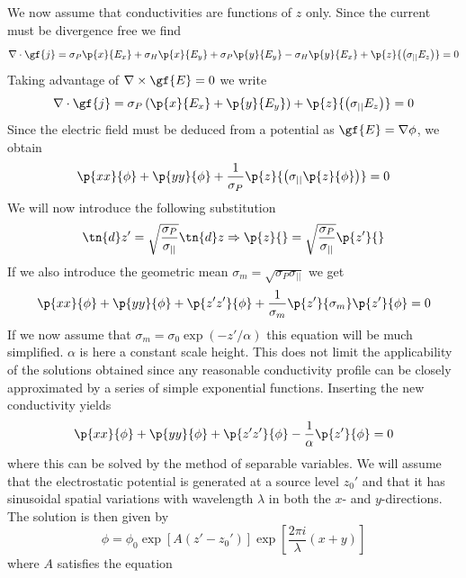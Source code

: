 We now assume that conductivities are functions of \(z\) only. Since the current must be divergence free we find
\begin{equation*}
    \nabla\cdot\gf{j}=\sigma_P\p{x}{E_x}+\sigma_H\p{x}{E_y}+\sigma_P\p{y}{E_y}-\sigma_H\p{y}{E_x}+\p{z}{\left(\sigma_{||}E_z\right)}=0
\end{equation*}
Taking advantage of \(\nabla\times\gf{E}=0\) we write
\begin{equation*}
    \nabla\cdot\gf{j}=\sigma_P\left(\p{x}{E_x}+\p{y}{E_y}\right)+\p{z}{\left(\sigma_{||}E_z\right)}=0
\end{equation*}
Since the electric field must be deduced from a potential as \(\gf{E}=\nabla\phi \), we obtain
\begin{equation*}
    \p{xx}{\phi}+\p{yy}{\phi}+\frac{1}{\sigma_P}\p{z}{\left(\sigma_{||}\p{z}{\phi}\right)}=0
\end{equation*}
We will now introduce the following substitution
\begin{equation*}
    \tn{d}z'=\sqrt{\frac{\sigma_P}{\sigma_{||}}}\tn{d}z \Rightarrow \p{z}{}=\sqrt{\frac{\sigma_P}{\sigma_{||}}}\p{z'}{}
\end{equation*}
If we also introduce the geometric mean \(\sigma_m=\sqrt{\sigma_P\sigma_{||}}\) we get
\begin{equation*}
    \p{xx}{\phi}+\p{yy}{\phi}+\p{z'z'}{\phi}+\frac{1}{\sigma_m}\p{z'}{\sigma_m}\p{z'}{\phi}=0
\end{equation*}
If we now assume that \(\sigma_m=\sigma_0\exp(-z'/\alpha)\) this equation will be much simplified. \(\alpha \) is here a constant scale height. This does not limit the applicability of the solutions obtained since any reasonable conductivity profile can be closely approximated by a series of simple exponential functions. Inserting the new conductivity yields
\begin{equation*}
    \p{xx}{\phi}+\p{yy}{\phi}+\p{z'z'}{\phi}-\frac{1}{\alpha}\p{z'}{\phi}=0
\end{equation*}
where this can be solved by the method of separable variables. We will assume that the electrostatic potential is generated at a source level \(z_0'\) and that it has sinusoidal spatial variations with wavelength \(\lambda \) in both the \(x\)- and \(y\)-directions. The solution is then given by
\begin{equation*}
    \phi=\phi_0\exp\left[A\left(z'-z_0'\right)\right]\exp\left[\frac{2\pi i}{\lambda}\left(x+y\right)\right]
\end{equation*}
where \(A\) satisfies the equation

